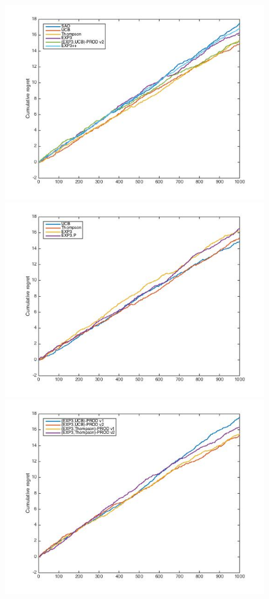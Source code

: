 \documentclass[10.5pt]{article}
\begin{document}
\begin{figure}[H]
  \includegraphics[width=\linewidth]{Stoch3_mix.jpg}
  \label{fig:awesome_image1}
\endminipage\hfill
{}
  \includegraphics[width=\linewidth]{Stoch3_old.jpg}
  \label{fig:awesome_image2}
\endminipage\hfill
{}%
  \includegraphics[width=\linewidth]{Stoch3_prod.jpg}

\end{figure}
\end{document}
